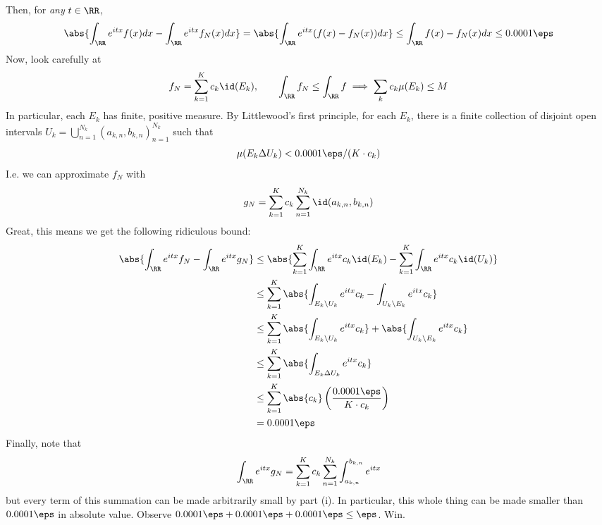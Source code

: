 \documentclass[11pt, headheight=30pt]{scrartcl}
\begin{document}
Then, for \emph{any} $t\in \RR$,
\[
    \abs{\int_\RR e^{itx}f(x) dx- \int_\RR e^{itx}f_N(x)dx} =\abs{\int_\RR e^{itx}(f(x) - f_N(x))dx} \leq \int_\RR f(x) - f_N(x) dx\leq 0.0001\eps
\]
Now, look carefully at
\[
    f_N = \sum_{k=1}^{K} c_k \id(E_k), \qquad \int_\RR f_N \leq \int_\RR f \implies \sum_k c_k\mu(E_k) \leq M
\]
In particular, each $E_k$ has finite, positive measure.
By Littlewood's first principle, for each $E_k$, there is a finite
collection of disjoint open intervals
$U_k = \bigcup_{n = 1}^{N_k}(a_{k,n}, b_{k,n})_{n=1}^{N_k}$ such that
\[
    \mu(E_k \Delta U_k) < 0.0001\eps / (K\cdot c_k)
\]
I.e. we can approximate $f_N$ with
\[
    g_N = \sum_{k=1}^{K} c_k \sum_{n=1}^{N_k} \id(a_{k,n}, b_{k,n})    
\]
Great, this means we get the following ridiculous bound:
\begin{align*}
    \abs{\int_\RR e^{itx}f_N - \int_\RR e^{itx}g_N}
    &\leq \abs{\sum_{k = 1}^K\int_\RR e^{itx} c_k \id(E_k) - \sum_{k=1}^K \int_\RR e^{itx} c_k \id(U_k)} \\
    &\leq \sum_{k = 1}^K\abs{\int_{E_k\setminus U_k} e^{itx}c_k - \int_{U_k\setminus E_k} e^{itx}c_k} \\
    &\leq \sum_{k = 1}^K\abs{\int_{E_k\setminus U_k} e^{itx}c_k} + \abs{\int_{U_k\setminus E_k} e^{itx}c_k} \\
    &\leq \sum_{k = 1}^K\abs{\int_{E_k\Delta U_k} e^{itx}c_k} \\
    &\leq \sum_{k = 1}^K \abs{c_k}\left(\frac{0.0001\eps}{K\cdot c_k}\right) \\
    &= 0.0001\eps
\end{align*}
Finally, note that
\[
    \int_\RR e^{itx}g_N = \sum_{k=1}^{K} c_k \sum_{n=1}^{N_k} \int_{a_{k,n}}^{b_{k,n}} e^{itx}    
\]
but every term of this summation can be made arbitrarily small by part (i).
In particular, this whole thing can be made smaller than $0.0001\eps$ in absolute value.
Observe $0.0001\eps + 0.0001\eps + 0.0001\eps \leq \eps$. Win.

\end{document}
